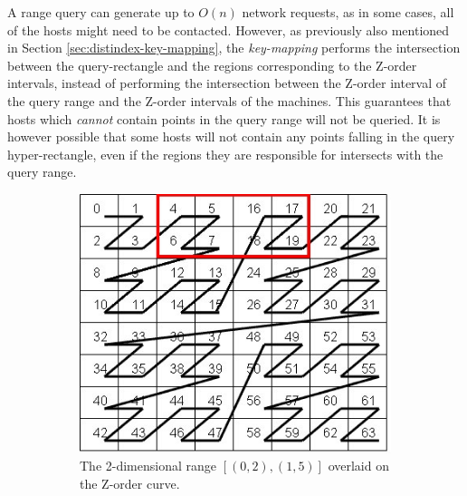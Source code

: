 \documentclass[11pt,a4paper]{globis-book}
\begin{document}
A range query can generate up to $O(n)$ network requests, as in some cases, all of the hosts might need to be contacted. However, as previously also mentioned in Section \ref{sec:distindex-key-mapping}, the \textit{key-mapping} performs the intersection between the query-rectangle and the regions corresponding to the Z-order intervals, instead of performing the intersection between the Z-order interval of the query range and the Z-order intervals of the machines. This guarantees that hosts which \textit{cannot} contain points in the query range will not be queried. It is however possible that some hosts will not contain any points falling in the query hyper-rectangle, even if the regions they are responsible for intersects with the query range.

\begin{figure}[t]
    \centering
    \begin{subfigure}[b]{0.4\linewidth}
        \includegraphics[width = \linewidth]{images/zordering-range}
        \caption{The 2-dimensional range $[(0, 2), (1, 5)]$ overlaid on the Z-order curve.}
        \label{fig:range-zorder}
    \end{subfigure}%
    \qquad
    \begin{subfigure}[b]{0.4\linewidth}

\end{subfigure}
\end{figure}
\end{document}

